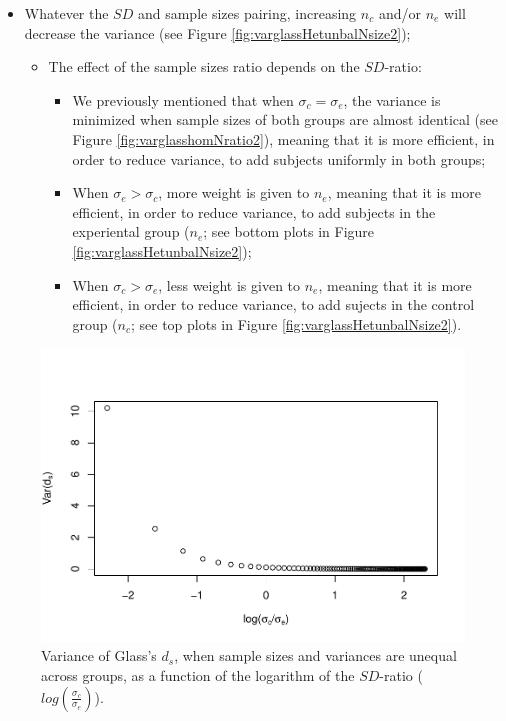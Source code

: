 \documentclass[
  man]{apa6}
\providecommand{\tightlist}{%
  \setlength{\itemsep}{0pt}\setlength{\parskip}{0pt}}
\begin{document}
\begin{itemize}
\item
  Whatever the \(SD\) and sample sizes pairing, increasing \(n_c\) and/or \(n_e\) will decrease the variance (see Figure \ref{fig:varglassHetunbalNsize2});

  \begin{itemize}
  \tightlist
  \item
    The effect of the sample sizes ratio depends on the \(SD\)-ratio:

    \begin{itemize}
    \tightlist
    \item
      We previously mentioned that when \(\sigma_c=\sigma_e\), the variance is minimized when sample sizes of both groups are almost identical (see Figure \ref{fig:varglasshomNratio2}), meaning that it is more efficient, in order to reduce variance, to add subjects uniformly in both groups;\\
    \item
      When \(\sigma_e > \sigma_c\), more weight is given to \(n_e\), meaning that it is more efficient, in order to reduce variance, to add subjects in the experiental group (\(n_e\); see bottom plots in Figure \ref{fig:varglassHetunbalNsize2});\\
    \item
      When \(\sigma_c > \sigma_e\), less weight is given to \(n_e\), meaning that it is more efficient, in order to reduce variance, to add sujects in the control group (\(n_c\); see top plots in Figure \ref{fig:varglassHetunbalNsize2}).
    \end{itemize}
  \end{itemize}
\end{itemize}

\begin{figure}
\centering
\includegraphics{Theoretical-Variance-of-all-estimators-as-a-function-of-population-parameters_files/figure-latex/varglasshetunbalSDratio2-1.pdf}
\caption{\label{fig:varglasshetunbalSDratio2}Variance of Glass's \(d_s\), when sample sizes and variances are unequal across groups, as a function of the logarithm of the \(SD\)-ratio (\(log \left( \frac{\sigma_c}{\sigma_e} \right)\)).}
\end{figure}
\end{document}
